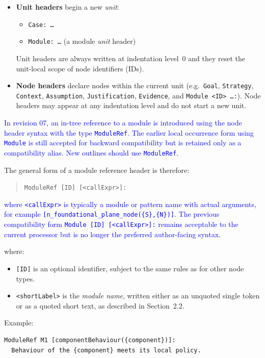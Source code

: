 \documentclass[11pt,twoside,a4paper]{article}
\begin{document}
\begin{itemize}[leftmargin=2em]
  \item \textbf{Unit headers} begin a new \emph{unit}:
  \begin{itemize}[leftmargin=1.5em]
    \item \texttt{Case: \dots}
    \item \texttt{Module: \dots} (a module \emph{unit} header)
  \end{itemize}
  Unit headers are always written at indentation level~0 and they reset the unit-local scope of node identifiers (IDs).
  \item \textbf{Node headers} declare nodes within the current unit (e.g.\ \texttt{Goal}, \texttt{Strategy}, \texttt{Context}, \texttt{Assumption}, \texttt{Justification}, \texttt{Evidence}, and \texttt{Module <ID> \dots :}).
  Node headers may appear at any indentation level and do not start a new unit.
\end{itemize}

\textcolor{blue}{In revision 07, an in-tree reference to a module is introduced using the node header syntax with the type \texttt{ModuleRef}. The earlier local occurrence form using \texttt{Module} is still accepted for backward compatibility but is retained only as a compatibility alias. New outlines should use \texttt{ModuleRef}.}

The general form of a module reference header is therefore:
\begin{quote}
\texttt{ModuleRef [ID] [<callExpr>]:}
\end{quote}

\textcolor{blue}{where \texttt{<callExpr>} is typically a module or pattern name with actual arguments, for example \texttt{[n\_foundational\_plane\_node(\{S\},\{N\})]}. The previous compatibility form \texttt{Module [ID] [<callExpr>]:} remains acceptable to the current processor but is no longer the preferred author-facing syntax.}

where:
\begin{itemize}[leftmargin=2em]
  \item \texttt{[ID]} is an optional identifier, subject to the same rules as for other node types.
  \item \texttt{\textless shortLabel\textgreater{}} is the \emph{module name}, written either as an
        unquoted single token or as a quoted short text, as described in Section~2.2.
\end{itemize}

Example:
\begin{verbatim}
ModuleRef M1 [componentBehaviour({component})]:
  Behaviour of the {component} meets its local policy.
\end{verbatim}
\end{document}
